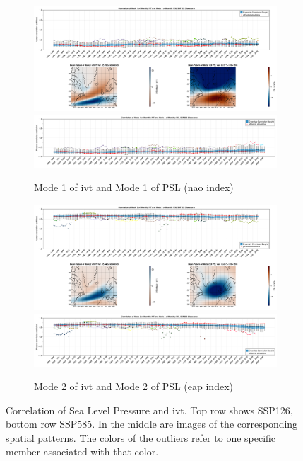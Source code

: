 \begin{figure}[!tbp]
  \begin{subfigure}[b]{0.49\textwidth}
        \includegraphics[width=\textwidth]{figures/correlation_boxplot_ivt_psl_modes11_ssp126_50seasons.png}
        \includegraphics[width=\textwidth]{figures/correlation_boxplot_ivt_psl_modes11_ssp585_50seasons.png}
    \caption{Mode 1 of \ac{ivt} and Mode 1 of PSL (\ac{nao} index)}
    \label{fig:cor ivt psl modes11}
  \end{subfigure}
  \hfill
  \begin{subfigure}[b]{0.49\textwidth}
        \includegraphics[width=\textwidth]{figures/correlation_boxplot_ivt_psl_modes22_ssp126_50seasons.png}
        \includegraphics[width=\textwidth]{figures/correlation_boxplot_ivt_psl_modes22_ssp585_50seasons.png}
    \caption{Mode 2 of \ac{ivt} and Mode 2 of PSL (\ac{eap} index)}
    \label{fig:cor ivt psl modes22}
  \end{subfigure}
  \caption{Correlation of Sea Level Pressure and \ac{ivt}. Top row shows SSP126, bottom row SSP585. In the middle are images of the corresponding spatial patterns. The colors of the outliers refer to one specific member associated with that color.}
\end{figure}

